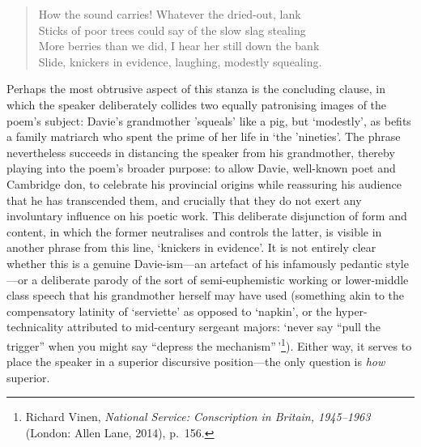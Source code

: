 \documentclass[]{article}
\begin{document}
\begin{quote}
How the sound carries! Whatever the dried-out, lank\\
Sticks of poor trees could say of the slow slag stealing\\
More berries than we did, I hear her still down the bank\\
Slide, knickers in evidence, laughing, modestly squealing.
\end{quote}

\noindent Perhaps the most obtrusive aspect of this stanza is the
concluding clause, in which the speaker deliberately collides two
equally patronising images of the poem's subject: Davie's grandmother
'squeals' like a pig, but `modestly', as befits a family matriarch who
spent the prime of her life in `the 'nineties'. The phrase nevertheless
succeeds in distancing the speaker from his grandmother, thereby playing
into the poem's broader purpose: to allow Davie, well-known poet and
Cambridge don, to celebrate his provincial origins while reassuring his
audience that he has transcended them, and crucially that they do not
exert any involuntary influence on his poetic work. This deliberate
disjunction of form and content, in which the former neutralises and
controls the latter, is visible in another phrase from this line,
`knickers in evidence'. It is not entirely clear whether this is a
genuine Davie-ism---an artefact of his infamously pedantic style---or a
deliberate parody of the sort of semi-euphemistic working or
lower-middle class speech that his grandmother herself may have used
(something akin to the compensatory latinity of `serviette' as opposed
to `napkin', or the hyper-technicality attributed to mid-century
sergeant majors: `never say ``pull the trigger'' when you might say
``depress the mechanism''\,'\footnote{Richard Vinen, \emph{National
  Service: Conscription in Britain, 1945--1963} (London: Allen Lane,
  2014), p.~156.}). Either way, it serves to place the speaker in a
superior discursive position---the only question is \emph{how} superior.
\end{document}
